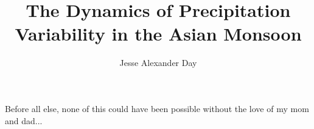 \documentclass{ucbthesis}
\begin{document}

\title{The Dynamics of Precipitation Variability in the Asian Monsoon}
\author{Jesse Alexander Day}


\maketitle
\approvalpage
\copyrightpage



\begin{frontmatter}



\tableofcontents
\clearpage
\listoffigures
\clearpage
\listoftables

\begin{acknowledgements}
Before all else, none of this could have been possible without the love of my mom and dad...
\end{acknowledgements}

\end{frontmatter}

\pagestyle{headings}












\printbibliography
\end{document}
